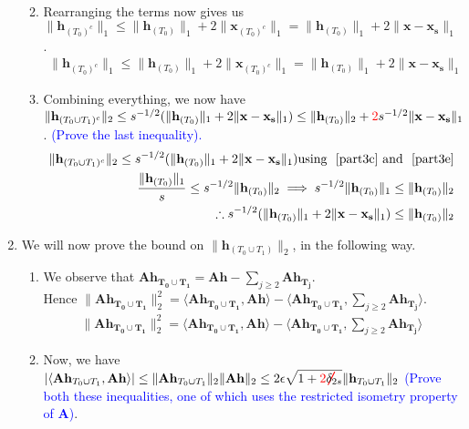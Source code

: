 \documentclass[11pt]{article}
\begin{document}
\begin{enumerate}
\begin{enumerate}
\begin{eqnarray}
\end{eqnarray}
\item Rearranging the terms now gives us $\|\mathbf{h}_{{(T_0)}^c}\|_1 \leq \|\mathbf{h}_{{(T_0)}}\|_1  + 2\|\mathbf{x}_{{(T_0)^c}}\|_1 = \|\mathbf{h}_{{(T_0)}}\|_1  + 2\|\mathbf{x}-\mathbf{x_s}\|_1$. 
\begin{eqnarray}\label{part3e}
\|\mathbf{h}_{{(T_0)}^c}\|_1 \leq \|\mathbf{h}_{{(T_0)}}\|_1  + 2\|\mathbf{x}_{{(T_0)^c}}\|_1 = \|\mathbf{h}_{{(T_0)}}\|_1  + 2\|\mathbf{x}-\mathbf{x_s}\|_1
\end{eqnarray}
\item Combining everything, we now have $\|\mathbf{h}_{(T_0 \cup T_1)^c}\|_2 \leq s^{-1/2}(\|\mathbf{h}_{{(T_0)}}\|_1  + 2\|\mathbf{x}-\mathbf{x_s}\|_1) \leq \|\mathbf{h}_{{(T_0)}}\|_2 + \textcolor{red}{2}s^{-1/2} \|\mathbf{x}-\mathbf{x_s}\|_1$. \textcolor{blue}{(Prove the last inequality).}
\begin{eqnarray}\label{part3f}
\|\mathbf{h}_{(T_0 \cup T_1)^c}\|_2 \leq s^{-1/2}(\|\mathbf{h}_{{(T_0)}}\|_1  + 2\|\mathbf{x}-\mathbf{x_s}\|_1) \text{using ~\ref{part3c} and ~\ref{part3e}}\\
\dfrac{\|\mathbf{h}_{{(T_0)}}\|_1}{s} \leq s^{-1/2}\|\mathbf{h}_{{(T_0)}}\|_2 \implies s^{-1/2}\|\mathbf{h}_{{(T_0)}}\|_1 \leq \|\mathbf{h}_{{(T_0)}}\|_2\\
\therefore s^{-1/2}(\|\mathbf{h}_{{(T_0)}}\|_1  + 2\|\mathbf{x}-\mathbf{x_s}\|_1) \leq \|\mathbf{h}_{{(T_0)}}\|_2
\end{eqnarray}
\end{enumerate}
\item We will now prove the bound on $\|\mathbf{h}_{(T_0 \cup T_1)}\|_2$, in the following way. 
\begin{enumerate}
\item We observe that $\mathbf{Ah_{T_0 \cup T_1}} = \mathbf{Ah} - \sum_{j \geq 2} \mathbf{Ah_{T_j}}$. \\
Hence $\|\mathbf{Ah_{T_0 \cup T_1}}\|^2_2 = \langle \mathbf{Ah_{T_0 \cup T_1}} , \mathbf{Ah}\rangle - \langle \mathbf{Ah_{T_0 \cup T_1}} , \sum_{j \geq 2} \mathbf{Ah_{T_j}}\rangle$.
\begin{eqnarray}\label{part4a}
\|\mathbf{Ah_{T_0 \cup T_1}}\|^2_2 = \langle \mathbf{Ah_{T_0 \cup T_1}} , \mathbf{Ah}\rangle - \langle \mathbf{Ah_{T_0 \cup T_1}} , \sum_{j \geq 2} \mathbf{Ah_{T_j}}\rangle
\end{eqnarray}
\item Now, we have $|\langle \mathbf{Ah}_{T_0 \cup T_1} , \mathbf{Ah}\rangle| \leq \|\mathbf{Ah}_{T_0 \cup T_1}\|_2 \|\mathbf{Ah}\|_2 \leq 2 \epsilon \sqrt{1 + \textcolor{red}{\cancel{2}}\delta_{2s}} \|\mathbf{h}_{T_0 \cup T_1}\|_2$ \textcolor{blue}{(Prove both these inequalities, one of which uses the restricted isometry property of $\mathbf{A}$)}.

\end{enumerate}
\end{enumerate}
\end{document}
